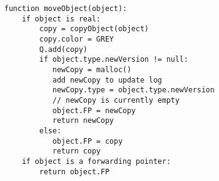 \begin{lstlisting}[frame=single]
function moveObject(object):
    if object is real:
        copy = copyObject(object)
        copy.color = GREY
        Q.add(copy)
        if object.type.newVersion != null:
           newCopy = malloc()
           add newCopy to update log
           newCopy.type = object.type.newVersion
           // newCopy is currently empty
           object.FP = newCopy
           return newCopy
        else:
           object.FP = copy
           return copy
    if object is a forwarding pointer:
        return object.FP
\end{lstlisting}
